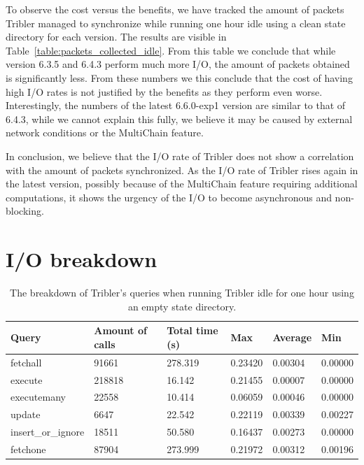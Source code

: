 To observe the cost versus the benefits, we have tracked the amount of packets Tribler managed to synchronize while running one hour idle using a clean state directory for each version.
The results are visible in Table~\ref{table:packets_collected_idle}.
From this table we conclude that while version 6.3.5 and 6.4.3 perform much more I/O, the amount of packets obtained is significantly less.
From these numbers we this conclude that the cost of having high I/O rates is not justified by the benefits as they perform even worse. 
Interestingly, the numbers of the latest 6.6.0-exp1 version are similar to that of 6.4.3, while we cannot explain this fully, we believe it may be caused by external network conditions or the MultiChain feature.

In conclusion, we believe that the I/O rate of Tribler does not show a correlation with the amount of packets synchronized. As the I/O rate of Tribler rises again in the latest version, possibly because of the MultiChain feature requiring additional computations, it shows the urgency of the I/O to become asynchronous and non-blocking.

\section{I/O breakdown}

\begin{table}[h]
	\centering
	\caption{The breakdown of Tribler's queries when running Tribler idle for one hour using an empty state directory.}
	\label{table:query_breakdown_tribler_empty_state_dir}
	\begin{tabular}{|l|l|l|l|l|l|}
		\hline
		\textbf{Query}     & \textbf{Amount of calls} & \textbf{Total time (s)} & \textbf{Max} & \textbf{Average} & \textbf{Min} \\ \hline
		fetchall           & 91661                    & 278.319                 & 0.23420      & 0.00304          & 0.00000      \\ \hline
		execute            & 218818                   & 16.142                  & 0.21455      & 0.00007          & 0.00000      \\ \hline
		executemany        & 22558                    & 10.414                  & 0.06059      & 0.00046          & 0.00000      \\ \hline
		update             & 6647                     & 22.542                  & 0.22119      & 0.00339          & 0.00227      \\ \hline
		insert\_or\_ignore & 18511                    & 50.580                  & 0.16437      & 0.00273          & 0.00000      \\ \hline
		fetchone           & 87904                    & 273.999                 & 0.21972      & 0.00312          & 0.00196      \\ \hline
	\end{tabular}
\end{table}

